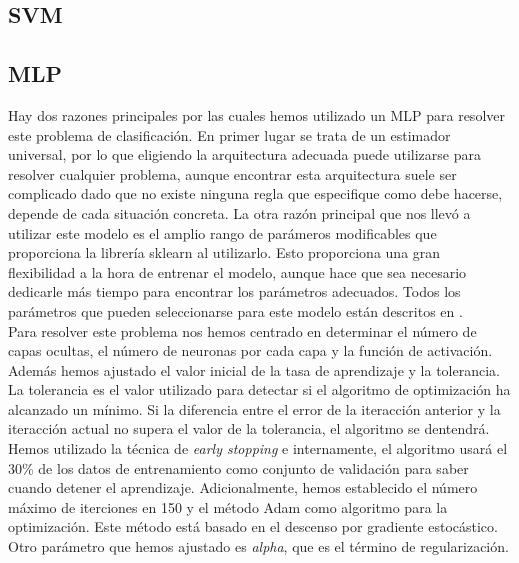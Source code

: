 \documentclass[journal,twoside]{JoPhA}
\begin{document}
\subsection{SVM}


\subsection{MLP}
Hay dos razones principales por las cuales hemos utilizado un MLP para resolver este problema de clasificación. En primer lugar se trata de un estimador universal, por lo que eligiendo la arquitectura adecuada puede utilizarse para resolver cualquier problema, aunque encontrar esta arquitectura suele ser complicado dado que no existe ninguna regla que especifique como debe hacerse, depende de cada situación concreta. La otra razón principal que nos llevó a utilizar este modelo es el amplio rango de parámeros modificables que proporciona la librería sklearn al utilizarlo. Esto proporciona una gran flexibilidad a la hora de entrenar el modelo, aunque hace que sea necesario dedicarle más tiempo para encontrar los parámetros adecuados. Todos los parámetros que pueden seleccionarse para este modelo están descritos en \cite{mlp}. \\

Para resolver este problema nos hemos centrado en determinar el número de capas ocultas, el número de neuronas por cada capa y la función de activación. Además hemos ajustado el valor inicial de la tasa de aprendizaje y la tolerancia. La tolerancia es el valor utilizado para detectar si el algoritmo de optimización ha alcanzado un mínimo. Si la diferencia entre el error de la iteracción anterior y la iteracción actual no supera el valor de la tolerancia, el algoritmo se dentendrá. Hemos utilizado la técnica de \textit{early stopping} e internamente, el algoritmo usará el 30\% de los datos de entrenamiento como conjunto de validación para saber cuando detener el aprendizaje. Adicionalmente, hemos establecido el número máximo de iterciones en 150 y el método Adam como algoritmo para la optimización. Este método está basado en el descenso por gradiente estocástico. Otro parámetro que hemos ajustado es \textit{alpha}, que es el término de regularización. \\
\end{document}
